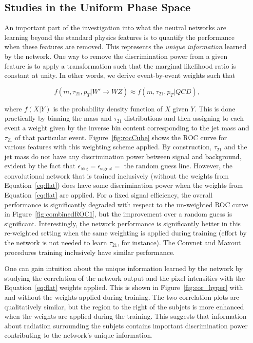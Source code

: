 \subsection{Studies in the Uniform Phase Space} %
\label{sub:flat_hypercube_studies}

An important part of the investigation into what the neutral networks are learning beyond the standard physics features is to quantify the performance when these features are removed.  This represents the {\it unique information} learned by the network.  One way to remove the discrimination power from a given feature is to apply a transformation such that the marginal likelihood ratio is constant at unity.  In other words, we derive event-by-event weights such that

\begin{equation}
\label{eq:flat}
  f(m, \tau_{21}, p_T| W'\rightarrow WZ) \approx f(m, \tau_{21}, p_T| QCD),
\end{equation}

\noindent where $f(X|Y)$ is the probability density function of $X$ given $Y$.  This is done practically by binning the mass and $\tau_{21}$ distributions and then assigning to each event a weight given by the inverse bin content corresponding to the jet mass and $\tau_{21}$ of that particular event. Figure~\ref{fig:rocCube} shows the ROC curve for various features with this weighting scheme applied.  By construction, $\tau_{21}$ and the jet mass do not have any discrimination power between signal and background, evident by the fact that $\epsilon_\text{bkg} = \epsilon_\text{signal} = $ the random guess line.    However, the convolutional network that is trained inclusively (without the weights from Equation~\ref{eq:flat}) does have some discrimination power when the weights from Equation~\ref{eq:flat} are applied.  For a fixed signal efficiency, the overall performance is significantly degraded with respect to the un-weighted ROC curve in Figure~\ref{fig:combinedROC1}, but the improvement over a random guess is significant.  Interestingly, the network performance is significantly better in this re-weighted setting when the same weighting is applied during training (effort by the network is not needed to learn $\tau_{21}$, for instance).  The Convnet and Maxout procedures training inclusively have similar performance.


One can gain intuition about the unique information learned by the network by studying the correlation of the network output and the pixel intensities with the Equation~\ref{eq:flat} weights applied.  This is shown in Figure~\ref{fig:cor_hyper} with and without the weights applied during training.  The two correlation plots are qualitatively similar, but the region to the right of the subjets is more enhanced when the weights are applied during the training.  This suggests that information about radiation surrounding the subjets contains important discrimination power contributing to the network's unique information.

